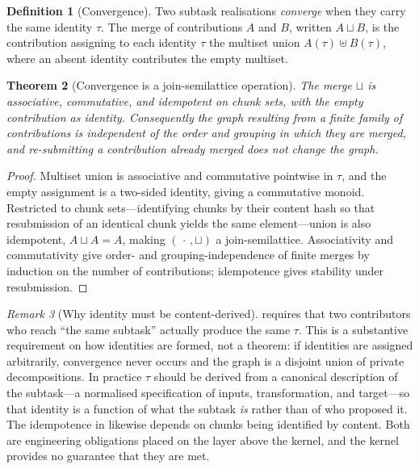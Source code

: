 \documentclass[11pt,a4paper]{article}
\theoremstyle{thmstyle}
\newtheorem{theorem}{Theorem}[section]
\theoremstyle{definition}
\newtheorem{definition}[theorem]{Definition}
\theoremstyle{remark}
\newtheorem{remark}[theorem]{Remark}
\begin{document}
\begin{definition}[Convergence]
\label{def:convergence}
Two subtask realisations \emph{converge} when they carry the same identity
$\tau$. The merge of contributions $A$ and $B$, written $A\sqcup B$, is the
contribution assigning to each identity $\tau$ the multiset union
$A(\tau)\uplus B(\tau)$, where an absent identity contributes the empty
multiset.
\end{definition}

\begin{theorem}[Convergence is a join-semilattice operation]
\label{thm:convergence-monoid}
The merge $\sqcup$ is associative, commutative, and idempotent on chunk
\emph{sets}, with the empty contribution as identity. Consequently the graph
resulting from a finite family of contributions is independent of the order
and grouping in which they are merged, and re-submitting a contribution
already merged does not change the graph.
\end{theorem}

\begin{proof}
Multiset union is associative and commutative pointwise in $\tau$, and the
empty assignment is a two-sided identity, giving a commutative monoid.
Restricted to chunk sets---identifying chunks by their content hash so that
resubmission of an identical chunk yields the same element---union is also
idempotent, $A\sqcup A=A$, making $(\,\cdot\,,\sqcup)$ a join-semilattice.
Associativity and commutativity give order- and grouping-independence of
finite merges by induction on the number of contributions; idempotence gives
stability under resubmission.
\end{proof}

\begin{remark}[Why identity must be content-derived]
\label{rem:identity}
 requires that two contributors who reach
``the same subtask'' actually produce the same $\tau$. This is a
substantive requirement on how identities are formed, not a theorem: if
identities are assigned arbitrarily, convergence never occurs and the graph
is a disjoint union of private decompositions. In practice $\tau$ should be
derived from a canonical description of the subtask---a normalised
specification of inputs, transformation, and target---so that identity is a
function of what the subtask \emph{is} rather than of who proposed it. The
idempotence in  likewise depends on chunks
being identified by content. Both are engineering obligations placed on the
layer above the kernel, and the kernel provides no guarantee that they are
met.
\end{remark}
\end{document}
